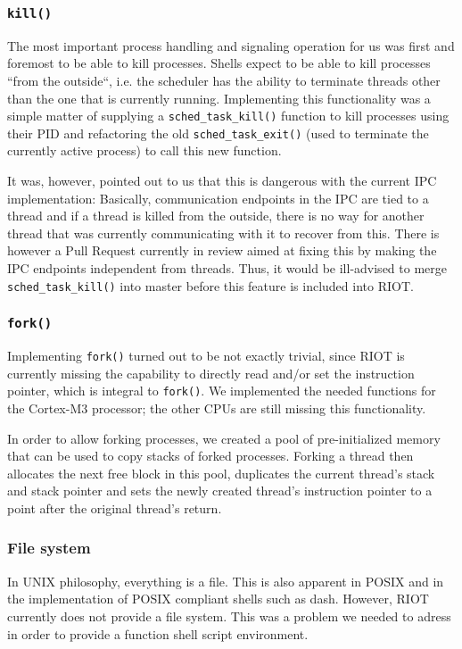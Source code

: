 \documentclass[conference]{IEEEtran}
\begin{document}
\subsubsection{\texttt{kill()}}
\label{ssub:kill}
The most important process handling and signaling operation for us was
first and foremost to be able to kill processes. Shells expect to be
able to kill processes ``from the outside``, i.e.  the scheduler has the
ability to terminate threads other than the one that is currently
running. Implementing this functionality was a simple matter of
supplying a \texttt{sched\_task\_kill()} function to kill processes
using their PID and refactoring the old \texttt{sched\_task\_exit()}
(used to terminate the currently active process) to call this new
function.

It was, however, pointed out to us\cite{1245} that this is dangerous
with the current IPC implementation: Basically, communication endpoints
in the IPC are tied to a thread and if a thread is killed from the
outside, there is no way for another thread that was currently
communicating with it to recover from this. There is however a Pull
Request\cite{1270} currently in review aimed at fixing this by making
the IPC endpoints independent from threads. Thus, it would be
ill-advised to merge \texttt{sched\_task\_kill()} into master before
this feature is included into RIOT.

\subsubsection{\texttt{fork()}}
\label{ssub:fork}
Implementing \texttt{fork()} turned out to be not exactly trivial, since
RIOT is currently missing the capability to directly read and/or set the
instruction pointer, which is integral to \texttt{fork()}. We
implemented the needed functions for the Cortex-M3 processor; the other
CPUs are still missing this functionality.

In order to allow forking processes, we created a pool of
pre-initialized memory that can be used to copy stacks of forked
processes. Forking a thread then allocates the next free block in this
pool, duplicates the current thread's stack and stack pointer and sets
the newly created thread's instruction pointer to a point after the
original thread's return.

\subsubsection{File system}
\label{ssub:File system}
In UNIX philosophy, everything is a file. This is also apparent in POSIX
and in the implementation of POSIX compliant shells such as dash.
However, RIOT currently does not provide a file system. This was
a problem we needed to adress in order to provide a function shell
script environment.
\end{document}
